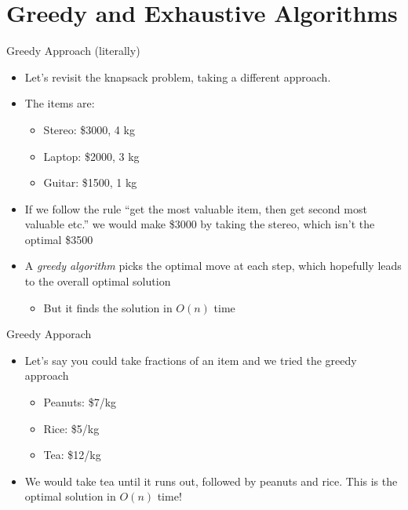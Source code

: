 \documentclass[
  ignorenonframetext,
]{beamer}
\providecommand{\tightlist}{%
  \setlength{\itemsep}{0pt}\setlength{\parskip}{0pt}}\usepackage{longtable,booktabs,array}
\begin{document}
\hypertarget{greedy-and-exhaustive-algorithms}{%
\section{Greedy and Exhaustive
Algorithms}\label{greedy-and-exhaustive-algorithms}}

\begin{frame}{Greedy Approach (literally)}
\protect\hypertarget{greedy-approach-literally}{}
\begin{itemize}
\item
  Let's revisit the knapsack problem, taking a different approach.
\item
  The items are:

  \begin{itemize}
  \item
    Stereo: \$3000, 4 kg
  \item
    Laptop: \$2000, 3 kg
  \item
    Guitar: \$1500, 1 kg
  \end{itemize}
\item
  If we follow the rule ``get the most valuable item, then get second
  most valuable etc.'' we would make \$3000 by taking the stereo, which
  isn't the optimal \$3500
\item
  A \emph{greedy algorithm} picks the optimal move at each step, which
  hopefully leads to the overall optimal solution

  \begin{itemize}
  \tightlist
  \item
    But it finds the solution in \(O(n)\) time
  \end{itemize}
\end{itemize}
\end{frame}

\begin{frame}{Greedy Apporach}
\protect\hypertarget{greedy-apporach}{}
\begin{itemize}
\item
  Let's say you could take fractions of an item and we tried the greedy
  approach

  \begin{itemize}
  \item
    Peanuts: \$7/kg
  \item
    Rice: \$5/kg
  \item
    Tea: \$12/kg
  \end{itemize}
\item
  We would take tea until it runs out, followed by peanuts and rice.
  This is the optimal solution in \(O(n)\) time!
\end{itemize}
\end{frame}
\end{document}
